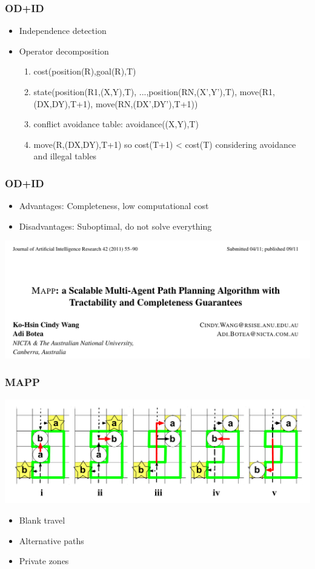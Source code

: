 \documentclass{beamer}
\begin{document}
\begin{frame}
\frametitle{OD+ID}
\begin{itemize} 
\item Independence detection
\item Operator decomposition
\begin{enumerate}
    \item cost(position(R),goal(R),T)
    \item state(position(R1,(X,Y),T), ...,position(RN,(X',Y'),T), move(R1,(DX,DY),T+1), move(RN,(DX',DY'),T+1))
    \item conflict avoidance table: avoidance((X,Y),T)
    \item move(R,(DX,DY),T+1) so cost(T+1) < cost(T) considering avoidance and illegal tables
\end{enumerate}
\end{itemize}
\end{frame}

\begin{frame}
\frametitle{OD+ID}
\begin{itemize} 
\item Advantages: Completeness, low computational cost
\item Disadvantages: Suboptimal, do not solve everything
\end{itemize} 
\end{frame}

\begin{frame}
\centering
\includegraphics[scale=0.3]{MAPP.png}
\end{frame}

\begin{frame}
\frametitle{MAPP}
\centering
\includegraphics[scale=0.47]{MAPP_example.png}
\begin{itemize} 
\item Blank travel 
\item Alternative paths
\item Private zones
\end{itemize} 
\end{frame}
\end{document}
